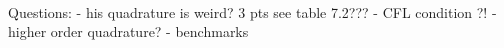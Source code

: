 \newpage
\begin{center}
\\
\end{center}

Questions:
- his quadrature is weird?  3 pts see table 7.2???
- CFL condition ?!
- higher order quadrature?
- benchmarks
